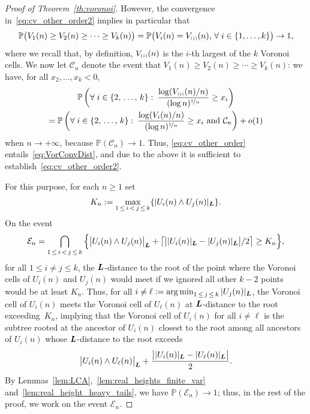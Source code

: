 \documentclass[AHL,Unicode,longabstracts,published]{cedram}
\DeclareMathOperator*{\argmin}{arg\,min}
\newcommand{\bs}{\ensuremath{\boldsymbol}}
\newcommand{\sss}{\ensuremath{\scriptscriptstyle}}
\newcommand{\bbP}{\mathbb{P}}
\newcommand{\clC}{\mathcal{C}}
\newcommand{\clE}{\mathcal{E}}
\let\oldforall\forall
\renewcommand*{\forall}{\mathrel{\oldforall}}
\begin{document}
\begin{proof}[Proof of Theorem~\ref{th:voronoi}]
However, the convergence in~\eqref{eq:cv_other_order2} implies in particular that
\[
\bbP\big(V_1(n)\geq V_2(n)\geq\cdots\geq V_k(n)\big) = \bbP \big(V_i(n) = V_{\sss (i)}(n), \,\forall i \in \{1, \ldots, k\} \big)
\to 1,
\]
where we recall that, by definition, $V_{\sss (i)}(n)$ is the $i$-th largest of the $k$ Voronoi cells. We now let $\clC_n$ denote the event that $V_1(n)\geq V_2(n)\geq\cdots\geq V_k(n)$: we have, for all $x_2, \ldots, x_k<0$,
\begin{multline*}
\bbP\left(\forall i \in \{2, \,\ldots,\,k\} \, \colon\, \frac{\log (V_{\sss (i)}(n)/n)}{(\log n)^{\nicefrac1\alpha}}\geq x_i\right)\\
=\bbP\left(\forall i \in \{2,\,\ldots,\,k\} \, \colon\, \frac{\log (V_i(n)/n)}{(\log n)^{\nicefrac1\alpha}}\geq x_i \text{ and }\clC_n\right)+o(1)
\end{multline*}
when $n\to+\infty$, because $\bbP(\clC_n)\to 1$. Thus, \eqref{eq:cv_other_order} entails~\eqref{eq:VorConvDist}, and due to the above it is sufficient to establish~\eqref{eq:cv_other_order2}.


For this purpose, for each $n\geq 1$ set
\begin{equation}\label{eq:Kdef}
K_n := \max_{1\,\leq\,i\,<\,j\,\leq\, k}\{|U_i(n)\wedge U_j(n)|_{\bs L}\}.
\end{equation}
On the event
\begin{equation}\label{eq:def_En}
\clE_n = \bigcap_{1\,\leq\,i\,<\,j\,\leq\,k}\Big\{\big|U_i(n)\wedge U_j(n)\big|_{\bs L}+\big\lceil\big||U_i(n)|_{\bs L} - |U_j(n)|_{\bs L}\big|/2\big\rceil\geq K_n\Big\},
\end{equation}
for all $1\leq i\neq j\leq k$, the $\bs L$-distance to the root of the point where the Voronoi cells of $U_i(n)$ and $U_j(n)$ would meet if we ignored all other $k-2$ points would be at least $K_n$. Thus, for all $i\neq \ell:=\argmin_{1\,\leq\,j\,\leq\,k} |U_j(n)|_{\bs L}$, the Voronoi cell of $U_i(n)$ meets the Voronoi cell of $U_\ell(n)$ at $\bs L$-distance to the root exceeding~$K_n$, implying that the Voronoi cell of $U_i(n)$ for all $i\neq \ell$ is the subtree rooted at the ancestor of $U_i(n)$ closest to the root among all ancestors of $U_i(n)$ whose $\bs L$-distance to the root exceeds
\begin{equation}\label{eq:constSpeed}
\big|U_i(n)\wedge U_\ell(n)\big|_{\bs L}+\frac{\big||U_i(n)|_{\bs L} - |U_\ell(n)|_{\bs L}\big|}2.
\end{equation}
By Lemmas~\ref{lem:LCA},~\ref{lem:real_heights_finite_var} and~\ref{lem:real_height_heavy_tails}, we have $\bbP(\clE_n) \to 1$; thus, in the rest of the proof, we work on the event $\clE_n$.


\end{proof}
\end{document}
